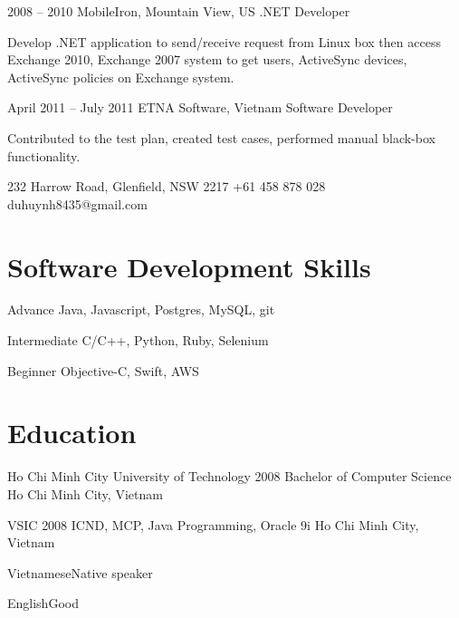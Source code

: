 \documentclass{tccv}
\begin{document}
\begin{eventlist}
\item{2008 -- 2010}
     {MobileIron, Mountain View, US}
     {.NET Developer}

Develop .NET application to send/receive request from
  Linux box then access Exchange 2010, Exchange 2007
  system to get users, ActiveSync devices, ActiveSync
  policies on Exchange system.

\item{April 2011 -- July 2011}
     {ETNA Software, Vietnam}
     {Software Developer}

Contributed to the test plan, created test cases, performed manual black-box functionality.

\end{eventlist}

\personal
    {232 Harrow Road, Glenfield, NSW 2217}
    {+61 458 878 028}
    {duhuynh8435@gmail.com}


\section{Software Development Skills}

\begin{factlist}

\item{Advance}
     {Java, Javascript, Postgres, MySQL, git}

\item{Intermediate}
     {C/C++, Python, Ruby, Selenium}

\item{Beginner}
     {Objective-C, Swift, AWS}
\end{factlist}

\section{Education}

\begin{yearlist}

\item[Ho Chi Minh City University of Technology]{2008}
     {Bachelor of Computer Science}
     {Ho Chi Minh City, Vietnam}

\item[VSIC]{2008}
     {ICND, MCP, Java Programming, Oracle 9i}
     {Ho Chi Minh City, Vietnam}

\end{yearlist}

\begin{factlist}
\item{Vietnamese}{Native speaker}
\item{English}{Good}
\end{factlist}
\end{document}
